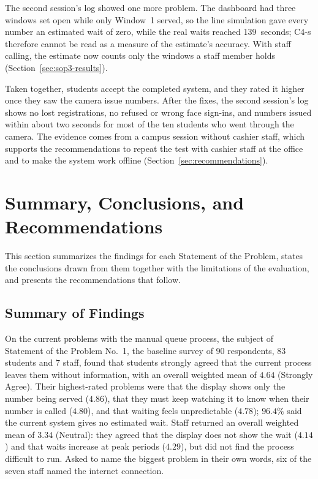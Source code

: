 \documentclass{research}
\begin{document}
The second session's log showed one more problem. The dashboard had three
windows set open while only Window~1 served, so the line simulation gave
every number an estimated wait of zero, while the real waits reached
139~seconds; C4-s therefore cannot be read as a measure of the
estimate's accuracy. With staff calling, the estimate now counts only
the windows a staff member holds (Section~\ref{sec:sop3-results}).

Taken together, students accept the completed system, and they rated it
higher once they saw the camera issue numbers. After the fixes, the
second session's log shows no lost registrations, no refused or wrong
face sign-ins, and numbers issued within about two seconds for most of
the ten students who went through the camera. The evidence comes from a
campus session without cashier staff, which supports the recommendations
to repeat the test with cashier staff at the office and to make the
system work offline (Section~\ref{sec:recommendations}).

\section{Summary, Conclusions, and Recommendations}
\label{ch:conclusions}

This section summarizes the findings for each Statement of the Problem,
states the conclusions drawn from them together with the limitations of
the evaluation, and presents the recommendations that follow.

\subsection{Summary of Findings}
\label{sec:summary-findings}

On the current problems with the manual queue process, the subject of
Statement of the Problem No.~1, the baseline survey of 90 respondents,
83 students and 7 staff, found that students strongly agreed that the
current process leaves them without information, with an overall
weighted mean of $4.64$ (Strongly Agree). Their highest-rated problems
were that the display shows only the number being served ($4.86$), that
they must keep watching it to know when their number is called
($4.80$), and that waiting feels unpredictable ($4.78$); $96.4\%$ said
the current system gives no estimated wait. Staff returned an overall
weighted mean of $3.34$ (Neutral): they agreed that the display does not
show the wait ($4.14$) and that waits increase at peak periods
($4.29$), but did not find the process difficult to run. Asked to name
the biggest problem in their own words, six of the seven staff named the
internet connection.
\end{document}
